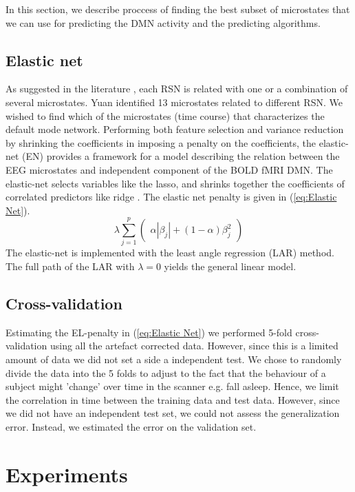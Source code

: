\documentclass{article}
\begin{document}
In this section, we describe proccess of finding the best subset of microstates that we can use for predicting the DMN activity and the predicting algorithms.
\subsection{Elastic net}
As suggested in the literature \cite{Yuan20122062}, each RSN is related with one or a combination of several microstates. Yuan identified 13 microstates related to different RSN. We wished to find which of the microstates (time course) that characterizes the default mode network. Performing both feature selection and variance reduction by shrinking the coefficients in imposing a penalty on the coefficients, the elastic-net (EN) \cite{hastie01} provides a framework for a model describing the relation between the EEG microstates and independent component of the BOLD fMRI DMN.
The elastic-net selects variables like the lasso, and shrinks together the coefficients of correlated predictors like ridge \cite{hastie01}. The elastic net penalty is given in (\ref{eq:Elastic Net}).
\begin{equation}
\label{eq:Elastic Net}
\lambda \sum_{j=1}^p
\begin{pmatrix}
\alpha |\beta_j| + (1-\alpha) \beta_j^2
\end{pmatrix}
\end{equation}
The elastic-net is implemented with the least angle regression (LAR) method. The full path of the LAR with $\lambda=0$ yields the general linear model.


\subsection{Cross-validation}
Estimating the EL-penalty in (\ref{eq:Elastic Net}) we performed 5-fold cross-validation using all the artefact corrected data. However, since this is a limited amount of data we did not set a side a independent test.
We chose to randomly divide the data into the 5 folds to adjust to the fact that the behaviour of a subject might 'change' over time in the scanner e.g. fall asleep. Hence, we limit the correlation in time between the training data and test data. However, since we did not have an independent test set, we could not assess the generalization error. Instead, we estimated the error on the validation set.



\section{Experiments}
\end{document}
